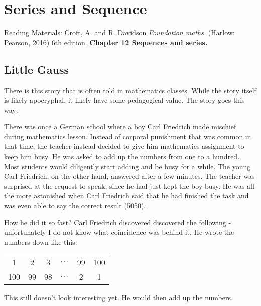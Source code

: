 \chapter{Series and Sequence}
Reading Materials: \newline
Croft, A. and R. Davidson \textit{Foundation maths.} (Harlow: Pearson, 2016) 6th edition. \textbf{Chapter 12 Sequences and series.}
\section{Little Gauss}
\noindent There is this story that is often told in mathematics classes. While the story itself is likely apocryphal, it likely have some pedagogical value. The story goes this way:

\vspace{5mm} %

\noindent There was once a German school where a boy Carl Friedrich made mischief during mathematics lesson. Instead of corporal punishment that was common in that time, the teacher instead decided to give him mathematics assignment to keep him busy. He was asked to add up the numbers from one to a hundred. Most students would diligently start adding and be busy for a while. The young Carl Friedrich, on the other hand, answered after a few minutes. The teacher was surprised at the request to speak, since he had just kept the boy busy. He was all the more astonished when Carl Friedrich said that he had finished the task and was even able to say the correct result (5050).

\vspace{5mm} %


\vspace{5mm} %

\noindent How he did it so fast? Carl Friedrich discovered discovered the following - unfortunately I do not know what coincidence was behind it. He wrote the numbers down like this:

\begin{center}
	\begin{tabular}{cccccc}
		1   & 2  & 3  & $\mathellipsis$ & 99 & 100 \\
		100 & 99 & 98 & $\mathellipsis$ & 2  & 1  
	\end{tabular}
\end{center}

\noindent This still doesn't look interesting yet. He would then add up the numbers.


